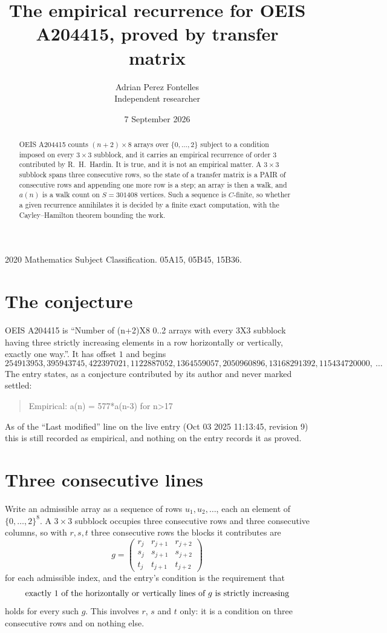 \documentclass[11pt,a4paper]{article}
\title{The empirical recurrence for OEIS A204415, proved by transfer matrix}
\author{Adrian Perez Fontelles\\ \small Independent researcher}
\date{7 September 2026}
\theoremstyle{plain}
\theoremstyle{definition}
\begin{document}
\maketitle

\begin{abstract}
OEIS A204415 counts $(n+2)\times8$ arrays over $\{0,\dots,2\}$ subject to a condition imposed on
every $3\times3$ subblock, and it carries an empirical recurrence of order $3$
contributed by R.~H.~Hardin. It is true, and it is not an empirical matter. A $3\times3$
subblock spans three consecutive rows, so the state of a transfer matrix is a PAIR of
consecutive rows and appending one more row is a step; an array is then a walk, and
$a(n)$ is a walk count on $S=301408$ vertices. Such a sequence is $C$-finite, so whether a given
recurrence annihilates it is decided by a finite exact computation, with the Cayley--Hamilton
theorem bounding the work.
\end{abstract}

\noindent\small 2020 Mathematics Subject Classification. 05A15, 05B45, 15B36.\normalsize

\section{The conjecture}

OEIS A204415 is ``Number of (n+2)X8 0..2 arrays with every 3X3 subblock having three strictly increasing elements in a row horizontally or vertically, exactly one way.''. It has offset $1$ and begins
\[
254913953, 395943745, 422397021, 1122887052, 1364559057, 2050960896, 13168291392, 115434720000,\ \dots
\]
The entry states, as a conjecture contributed by its author and never marked settled:
\begin{quote}
Empirical: a(n) = 577*a(n-3) for n>17
\end{quote}
As of the ``Last modified'' line on the live entry (Oct 03 2025 11:13:45, revision 9) this is still
recorded as empirical, and nothing on the entry records it as proved.

\section{Three consecutive lines}

Write an admissible array as a sequence of rows $u_1,u_2,\dots$, each an element of
$\{0,\dots,2\}^{8}$. A $3\times3$ subblock occupies three consecutive rows and
three consecutive columns, so with $r,s,t$ three consecutive rows the blocks it
contributes are
\[
g=\begin{pmatrix}r_j&r_{j+1}&r_{j+2}\\ s_j&s_{j+1}&s_{j+2}\\ t_j&t_{j+1}&t_{j+2}\end{pmatrix}
\]
for each admissible index, and the entry's condition is the requirement that
\[
\text{exactly }1\text{ of the horizontally or vertically lines of }g\text{ \text{is strictly increasing}}
\]
holds for every such $g$. This involves $r$, $s$ and $t$ only: it is a condition on
three consecutive rows and on nothing else.
\end{document}
